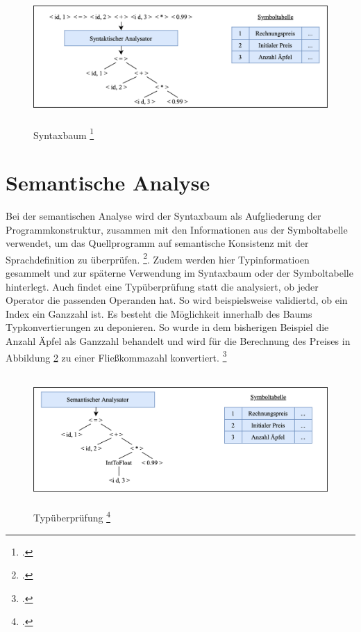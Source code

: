 \begin{figure}[!ht]
 \includegraphics[width=14.5cm,height=5cm]{Images/Compiler/ParserResult.png}
 \caption[Syntaxbaum]{Syntaxbaum \protect\footcite{Ullmann2008} }
 \label{fig:ParserResult}
\end{figure}
\section{Semantische Analyse}

Bei der semantischen Analyse wird der Syntaxbaum    als Aufgliederung der Programmkonstruktur,  zusammen mit den Informationen aus der Symboltabelle verwendet,  um das Quellprogramm auf semantische Konsistenz mit der Sprachdefinition zu überprüfen. \footcite[Vgl.][S. 157]{Wilhelm2012}.  Zudem werden hier Typinformatioen gesammelt und zur späterne Verwendung im Syntaxbaum oder der Symboltabelle hinterlegt.  Auch findet eine Typüberprüfung statt die analysiert, ob jeder Operator die passenden Operanden hat.  So wird beispielsweise validiertd,  ob ein Index ein Ganzzahl ist.  Es besteht die Möglichkeit innerhalb des Baums Typkonvertierungen zu deponieren.  So wurde in dem bisherigen Beispiel die Anzahl Äpfel als Ganzzahl behandelt und wird für die Berechnung des Preises in Abbildung \ref{fig:Typ} zu einer Fließkommazahl konvertiert. \footcite[Vgl.][S. 9ff]{Ullmann2008}

\begin{figure}[!ht]
 \includegraphics[width=14.5cm,height=5cm]{Images/Compiler/Type.png}
 \caption[Typüberprüfung]{Typüberprüfung \protect\footcite{Ullmann2008} }
 \label{fig:Typ}
\end{figure}
